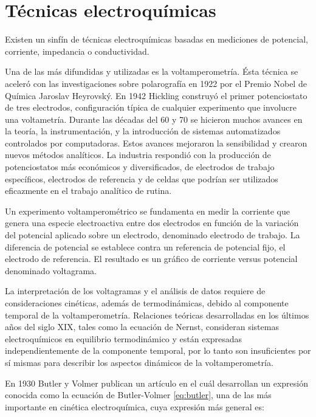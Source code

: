 \section{Técnicas electroquímicas}
					
		Existen un sinfín de técnicas electroquímicas basadas en mediciones de potencial, corriente, impedancia o conductividad.\cite{Wi2000,Bockris1974,koryta1993}

		Una de las más difundidas y utilizadas es la voltamperometría. Ésta técnica se aceleró con las investigaciones sobre polarografía en 1922 por el Premio Nobel de Química Jaroslav Heyrovský.\cite{Zuman1960} En 1942 Hickling construyó el primer potenciostato de tres electrodos, configuración típica de cualquier experimento que involucre una voltametría. \cite{hickling1942} Durante las décadas del 60 y 70 se hicieron muchos avances en la teoría, la instrumentación, y la introducción de sistemas automatizados controlados por computadoras. Estos avances mejoraron la sensibilidad y crearon nuevos métodos analíticos. La industria respondió con la producción de potenciostatos más económicos y diversificados, de electrodos de trabajo específicos, electrodos de referencia y de celdas que podrían ser utilizados eficazmente en el trabajo analítico de rutina.\cite{Wi2000}

		Un experimento voltamperométrico se fundamenta en medir la corriente que genera una especie electroactiva entre dos electrodos en función de la variación del potencial aplicado sobre un electrodo, denominado electrodo de trabajo. La diferencia de potencial se establece contra un referencia de potencial fijo, el electrodo de referencia. El resultado es un gráfico de corriente versus potencial denominado voltagrama.

		La interpretación de los voltagramas y el análisis de datos requiere de consideraciones cinéticas, además de termodinámicas, debido al componente temporal de la voltamperometría. Relaciones teóricas desarrolladas en los últimos años del siglo XIX, tales como la ecuación de Nernst, consideran sistemas electroquímicos en equilibrio termodinámico y están expresadas independientemente de la componente temporal, por lo tanto son insuficientes por sí mismas para describir los aspectos dinámicos de la voltamperometría.\cite{nnnicholson1964}

		En 1930 Butler y Volmer publican un artículo en el cuál desarrollan un expresión conocida como la ecuación de Butler-Volmer \ref{eq:butler}, una de las más importante en cinética electroquímica, cuya expresión más general es\cite{Erdey-Gruz1930}: 

